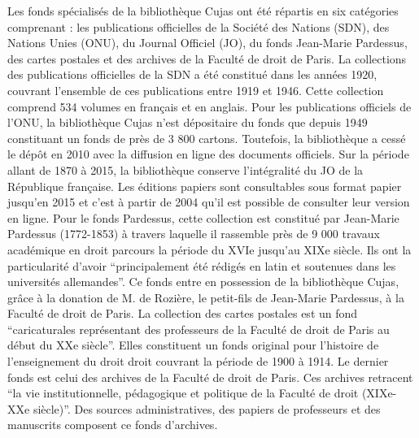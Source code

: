 Les fonds spécialisés de la bibliothèque Cujas ont été répartis en six catégories comprenant : les publications officielles de la Société des Nations (SDN), des Nations Unies (ONU), du Journal Officiel (JO), du fonds Jean-Marie Pardessus, des cartes postales et des archives de la Faculté de droit de Paris. La collections des publications officielles de la SDN a été constitué dans les années 1920, couvrant l'ensemble de ces publications entre 1919 et 1946. Cette collection comprend 534 volumes en français et en anglais. Pour les publications officiels de l'ONU, la bibliothèque Cujas n'est dépositaire du fonds que depuis 1949 constituant un fonds de près de 3 800 cartons. Toutefois, la bibliothèque a cessé le dépôt en 2010 avec la diffusion en ligne des documents officiels. Sur la période allant de 1870 à 2015, la bibliothèque conserve l'intégralité du JO de la République française. Les éditions papiers sont consultables sous format papier jusqu'en 2015 et c'est à partir de 2004 qu'il est possible de consulter leur version en ligne. Pour le fonds Pardessus, cette collection est constitué par Jean-Marie Pardessus (1772-1853) à travers laquelle il rassemble près de 9 000 travaux académique en droit parcours la période du XVIe jusqu'au XIXe siècle. Ils ont la particularité d'avoir \enquote{principalement été rédigés en latin et soutenues dans les universités allemandes}. Ce fonds entre en possession de la bibliothèque Cujas, grâce à la donation de M. de Rozière, le petit-fils de Jean-Marie Pardessus, à la Faculté de droit de Paris. La collection des cartes postales est un fond \enquote{caricaturales représentant des professeurs de la Faculté de droit de Paris au début du XXe siècle}. Elles constituent un fonds original pour l'histoire de l'enseignement du droit droit couvrant la période de 1900 à 1914. Le dernier fonds est celui des archives de la Faculté de droit de Paris. Ces archives retracent \enquote{la vie institutionnelle, pédagogique et politique de la Faculté de droit (XIXe-XXe siècle)}. Des sources administratives, des papiers de professeurs et des manuscrits composent ce fonds d'archives.
	
